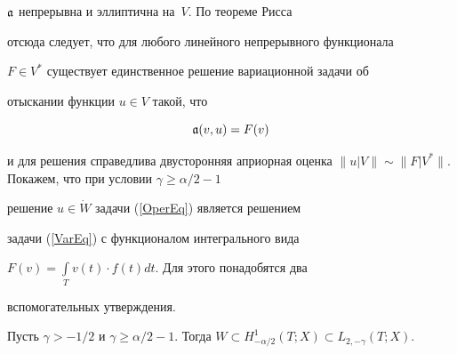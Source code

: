 $\frak a$ непрерывна и эллиптична на~$V$. По теореме Рисса


отсюда следует, что для любого линейного непрерывного функционала


$F \in V^*$ существует единственное решение вариационной задачи об


отыскании функции $u \in V$ такой, что


\begin{equation}\label{VarEq}


\frak a(v,u)=F(v)


\end{equation}


и для решения справедлива двусторонняя априорная оценка $\|u|V\|


\sim \|F|V^*\|$. Покажем, что при условии $\gamma \ge \alpha/2-1$


решение $u \in \Dot{W}$ задачи (\ref{OperEq}) является решением


задачи (\ref{VarEq}) с функционалом интегрального вида


$F(v)=\int\limits_T v(t) \cdot f(t) dt$. Для этого понадобятся два


вспомогательных утверждения.








\begin{lems}\label{Imb}


Пусть $\gamma > -1/2$ и $\gamma \ge \alpha/2-1$. Тогда $W \subset


H^1_{-\alpha/2}(T;X) \subset L_{2,-\gamma}(T;X)$.


\end{lems}








